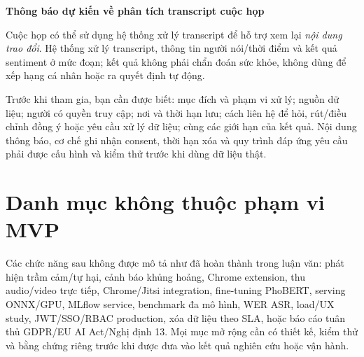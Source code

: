 \begin{mdframed}[linecolor=accentblue, linewidth=1.0pt, topline=true]
\textbf{Thông báo dự kiến về phân tích transcript cuộc họp}

Cuộc họp có thể sử dụng hệ thống xử lý transcript để hỗ trợ xem lại \emph{nội dung trao đổi}. Hệ thống xử lý transcript, thông tin người nói/thời điểm và kết quả sentiment ở mức đoạn; kết quả không phải chẩn đoán sức khỏe, không dùng để xếp hạng cá nhân hoặc ra quyết định tự động.

Trước khi tham gia, bạn cần được biết: mục đích và phạm vi xử lý; nguồn dữ liệu; người có quyền truy cập; nơi và thời hạn lưu; cách liên hệ để hỏi, rút/điều chỉnh đồng ý hoặc yêu cầu xử lý dữ liệu; cùng các giới hạn của kết quả. Nội dung thông báo, cơ chế ghi nhận consent, thời hạn xóa và quy trình đáp ứng yêu cầu phải được cấu hình và kiểm thử trước khi dùng dữ liệu thật.
\end{mdframed}

\section{Danh mục không thuộc phạm vi MVP}
Các chức năng sau không được mô tả như đã hoàn thành trong luận văn: phát hiện trầm cảm/tự hại, cảnh báo khủng hoảng, Chrome extension, thu audio/video trực tiếp, Chrome/Jitsi integration, fine-tuning PhoBERT, serving ONNX/GPU, MLflow service, benchmark đa mô hình, WER ASR, load/UX study, JWT/SSO/RBAC production, xóa dữ liệu theo SLA, hoặc báo cáo tuân thủ GDPR/EU AI Act/Nghị định 13. Mọi mục mở rộng cần có thiết kế, kiểm thử và bằng chứng riêng trước khi được đưa vào kết quả nghiên cứu hoặc vận hành.
